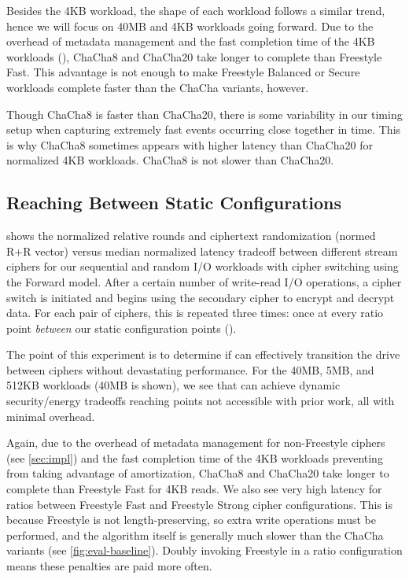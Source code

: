 Besides the 4KB workload, the shape of each workload follows a similar trend,
hence we will focus on 40MB and 4KB workloads going forward. Due to the overhead
of metadata management and the fast completion time of the 4KB workloads
(), ChaCha8 and ChaCha20 take
longer to complete than Freestyle Fast. This advantage is not enough to make
Freestyle Balanced or Secure workloads complete faster than the ChaCha variants,
however.

Though ChaCha8 is faster than ChaCha20, there is some variability in our timing
setup when capturing extremely fast events occurring close together in time.
This is why ChaCha8 sometimes appears with higher latency than ChaCha20 for
normalized 4KB workloads. ChaCha8 is not slower than ChaCha20.


\subsection{Reaching Between Static Configurations}\label{subsec:eval-dynamic}



 shows the normalized relative rounds and ciphertext
randomization (normed R+R vector) versus median normalized latency tradeoff
between different stream ciphers for our sequential and random I/O workloads
with cipher switching using the Forward model. After a certain number of
write-read I/O operations, a cipher switch is initiated and \sys begins using
the secondary cipher to encrypt and decrypt data. For each pair of ciphers, this
is repeated three times: once at every ratio point {\em between} our static
configuration points ().

The point of this experiment is to determine if \sys can effectively transition
the drive between ciphers without devastating performance. For the 40MB, 5MB,
and 512KB workloads (40MB is shown), we see that \sys can achieve dynamic
security/energy tradeoffs reaching points not accessible with prior work, all
with minimal overhead.

Again, due to the overhead of metadata management for non-Freestyle ciphers (see
\cref{sec:impl}) and the fast completion time of the 4KB workloads preventing
\sys from taking advantage of amortization, ChaCha8 and ChaCha20 take longer to
complete than Freestyle Fast for 4KB reads. We also see very high latency for
ratios between Freestyle Fast and Freestyle Strong cipher configurations. This
is because Freestyle is not length-preserving, so extra write operations must be
performed, and the algorithm itself is generally much slower than the ChaCha
variants (see \cref{fig:eval-baseline}). Doubly invoking Freestyle in a ratio
configuration means these penalties are paid more often.

